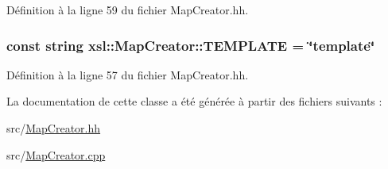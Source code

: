 Définition à la ligne 59 du fichier MapCreator.hh.

\hypertarget{classxsl_1_1_map_creator_aa30355e649cecf057740506f71d49bcd}{
\subsubsection[{TEMPLATE}]{\setlength{\rightskip}{0pt plus 5cm}const string {\bf xsl::MapCreator::TEMPLATE} = \char`\"{}template\char`\"{}}}
\label{classxsl_1_1_map_creator_aa30355e649cecf057740506f71d49bcd}


Définition à la ligne 57 du fichier MapCreator.hh.



La documentation de cette classe a été générée à partir des fichiers suivants :\begin{DoxyCompactItemize}
\item 
src/\hyperlink{_map_creator_8hh}{MapCreator.hh}\item 
src/\hyperlink{_map_creator_8cpp}{MapCreator.cpp}\end{DoxyCompactItemize}
